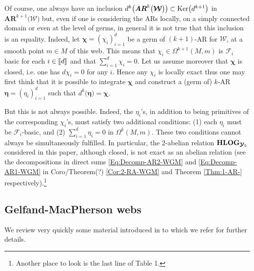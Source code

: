 \documentclass[11pt]{amsart}
\newcommand{\sk}{\smallskip}
\newcommand{\mk}{\medskip}
\begin{document}
Of course, one always have an inclusion $d^k\big( 
\boldsymbol{AR}^k\big(\boldsymbol{\mathcal W}\big)
\big) \subset {\rm Ker}\big(d^{k+1}\big)$ in 
$\boldsymbol{AR}^{k+1}\big(\boldsymbol{\mathcal W}\big)$
 but, even if one is considering the ARs locally, on a simply connected domain or even at the level of germs,  in general it is not true that this inclusion is an equality. Indeed, let 
 $\boldsymbol{\chi}=(\chi_i)_{i=1}^d$ be a germ of $(k+1)$-AR for $\boldsymbol{\mathcal W}$, at a smooth point $m\in M$ of this web. 
  This means that $\chi_i\in \Omega^{k+1}(M,m)$ is $\mathcal F_i$ basic for each ${i \in [\hspace{-0.05cm}[ d
]\hspace{-0.05cm}]}$ and that $\sum_{i=1}^d \chi_i=0$. Let us assume moreover that $\boldsymbol{\chi}$ is closed, i.e. one has $d\chi_i=0$ for any $i$.  Hence any $\chi_i$ is locally exact thus one may first think that it is possible to integrate $\boldsymbol{\chi}$ and construct a (germ of) $k$-AR $\boldsymbol{\eta}=(\eta_i)_{i=1}^d$ such that $d^k\big( \boldsymbol{\eta}\big)=\boldsymbol{\chi}$.  

But this is not always possible. Indeed, the $\eta_i$'s, in addition to being primitives of the corresponding $\chi_i$'s, must satisfy two additional conditions: (1) each $\eta_i$ must be $\mathcal F_i$-basic, and (2) $\sum_{i=1}^d \eta_i=0$ in $\Omega^k(M,m)$. These two conditions cannot always be simultaneously fulfilled. In particular, the 2-abelian relation ${\bf HLOG}_{ \boldsymbol{\mathcal Y}_5}$ considered in this paper, although closed, is not exact as an abelian relation (see the decompositions in direct sums 
 \eqref{Eq:Decomp-AR2-WGM}
 and 
 \eqref{Eq:Decomp-AR1-WGM} 
 in 
Coro/Theorem(?)  \ref{Cor:2-RA-WGM} and Theorem \ref{Thm:1-AR-} respectively).\footnote{Another place to look is the last line of Table 1.} 
%
%



\subsection{\bf Gelfand-MacPherson webs}
\label{SS:Gelfand-MacPherson webs}
We review very quickly some  material introduced in \cite[\S4.5.1]{PirioAFST} to which we refer for further details. \sk
\end{document}
